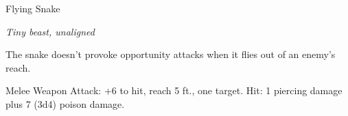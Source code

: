 \begin{monsterbox}{Flying Snake}
\begin{hangingpar}
\textit{Tiny beast, unaligned}
\end{hangingpar}
\dndline%
\basics[%
armorclass = 14,
hitpoints = 2d4,
speed = {30 ft., fly 60 ft., swim 30 ft.}
]
\dndline%
\stats[%
STR = \stat{4},
DEX = \stat{18},
CON = \stat{11},
INT = \stat{2},
WIS = \stat{12},
CHA = \stat{5}
]
\dndline%
\details[%
skills={},
damageimmunities={},
savingthrows={},
conditionimmunities={},
damageresistances={},
damagevulnerabilities={},
senses={blindsight 10 ft., passive Perception 11},
challenge=1/8
]
\dndline%
\begin{monsteraction}[Flyby]
The snake doesn't provoke opportunity attacks when it flies out of an enemy's reach.
\end{monsteraction}
\begin{monsteraction}[Bite]
Melee Weapon Attack: +6 to hit, reach 5 ft., one target. Hit: 1 piercing damage plus 7 (3d4) poison damage.
\end{monsteraction}
\end{monsterbox}